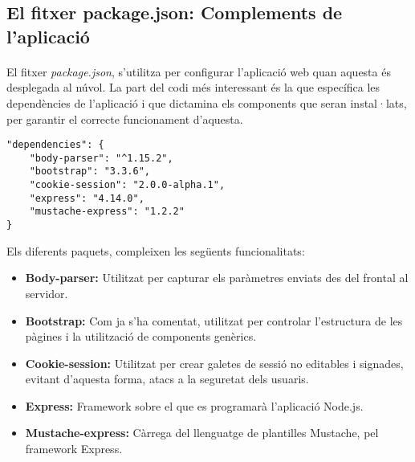 \subsection{El fitxer package.json: Complements de l'aplicació}

    \paragraph{}
    El fitxer \emph{package.json}, s'utilitza per configurar l'aplicació web quan aquesta és desplegada al núvol. La part del codi més interessant és la que específica les dependències de l'aplicació i que dictamina els components que seran instal·lats, per garantir el correcte funcionament d'aquesta.

    \clearpage

    \begin{lstlisting}[style=rawOwn,caption={Dependències declarades en el fitxer pacakge.json}]
"dependencies": {
    "body-parser": "^1.15.2",
    "bootstrap": "3.3.6",
    "cookie-session": "2.0.0-alpha.1",
    "express": "4.14.0",
    "mustache-express": "1.2.2"
}
    \end{lstlisting}

    Els diferents paquets, compleixen les següents funcionalitats:

    \begin{itemize}
        \item \textbf{Body-parser:} Utilitzat per capturar els paràmetres enviats des del frontal al servidor.
        \item \textbf{Bootstrap:} Com ja s'ha comentat, utilitzat per controlar l'estructura de les pàgines i la utilització de components genèrics.
        \item \textbf{Cookie-session:} Utilitzat per crear galetes de sessió no editables i signades, evitant d'aquesta forma, atacs a la seguretat dels usuaris.
        \item \textbf{Express:} Framework sobre el que es programarà l'aplicació Node.js.
        \item \textbf{Mustache-express:} Càrrega del llenguatge de plantilles Mustache, pel frame\-work Express.
    \end{itemize}
